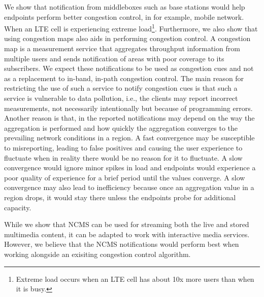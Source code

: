 We show that notification from middleboxes such as base stations would
help endpoints perform better congestion control, in for example, mobile network. 
When an LTE cell is experiencing extreme load\footnote{Extreme load
occurs when an LTE cell has about 10x more users than when it is busy.}.
Furthermore, we also show that using congestion maps also aids in performing
congestion control. A congestion map is a measurement service that aggregates
throughput information from multiple users and sends notification of areas
with poor coverage to its subscribers. We expect these notifications to be
used as congestion cues and not as a replacement to in-band, in-path
congestion control. The main reason for restricting the use of such a service
to notify congestion cues is that such a service is vulnerable to data
pollution, i.e., the clients may report incorrect measurements, not
necessarily intentionally but because of programming errors. Another reason is
that, in the reported notifications may depend on the way the aggregation is
performed and how quickly the aggregation converges to the prevailing network
conditions in a region. A fast convergence may be susceptible to misreporting,
leading to false positives and causing the user experience to fluctuate when in
reality there would be no reason for it to fluctuate. A slow convergence would
ignore minor spikes in load and endpoints would experience a poor quality of
experience for a brief period until the values converge. A slow convergence
may also lead to inefficiency because once an aggregation value in a region
drops, it would stay there unless the endpoints probe for additional capacity.

While we show that NCMS can be used for streaming both the live and stored
multimedia content, it can be adapted to work with interactive media services.
However, we believe that the NCMS notifications would perform best when
working alongside an exisiting congestion control algorithm.
